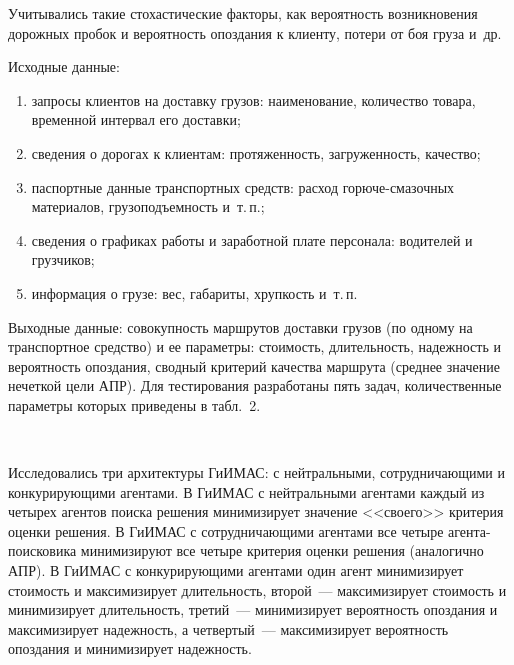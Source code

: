 \begin{multicols}{2}
Учитывались 
такие стохастические факторы, как вероятность возникновения дорожных 
пробок и вероятность опоздания к клиенту, потери от боя груза и~др.
  
  Исходные данные:
  \begin{enumerate}[(1)]
  \item запросы клиентов на доставку грузов: наименование, 
количество товара, временной интервал его доставки; 
\item сведения о дорогах к 
клиентам: протяженность, загруженность, качество;
\item паспортные данные 
транспортных средств: расход го\-рю\-че-сма\-зоч\-ных материалов, 
грузоподъемность и~т.\,п.; 
\item сведения о графиках работы и заработной плате 
персонала: водителей и грузчиков; 
\item информация о грузе: вес, габариты, 
хрупкость и~т.\,п. 
\end{enumerate}
  
  Выходные данные: совокупность маршрутов доставки грузов (по одному на 
транспортное средство) и ее параметры: стоимость, длительность, надежность и 
вероятность опоздания, сводный критерий качества маршрута (среднее 
значение нечеткой цели АПР). Для тестирования разработаны пять задач, 
количественные параметры которых приведены в табл.~2.
  
\begin{figure*} %
  \vspace*{9pt}
 \begin{center}
 \mbox{%
 \epsfxsize=113.371mm
 }
 \end{center}
 \vspace*{-6pt}
\end{figure*}

  Исследовались три архитектуры ГиИМАС: с нейтральными, 
сотрудничающими и конкурирующими агентами. В ГиИМАС с нейтральными 
агентами каждый из четырех агентов поиска решения минимизирует значение 
<<своего>> критерия оценки решения. В ГиИМАС с сотрудничающими 
агентами все четыре аген\-та-по\-иско\-ви\-ка минимизируют все четыре 
критерия оценки решения (аналогично АПР). В ГиИМАС с конкурирующими 
агентами один агент минимизирует стоимость и максимизирует длительность, 
второй~--- максимизирует стоимость и минимизирует длительность, третий~--- 
минимизирует вероятность опоздания и максимизирует надежность, а 
четвертый~--- максимизирует вероятность опоздания и минимизирует 
надежность. 
  

\end{multicols}
